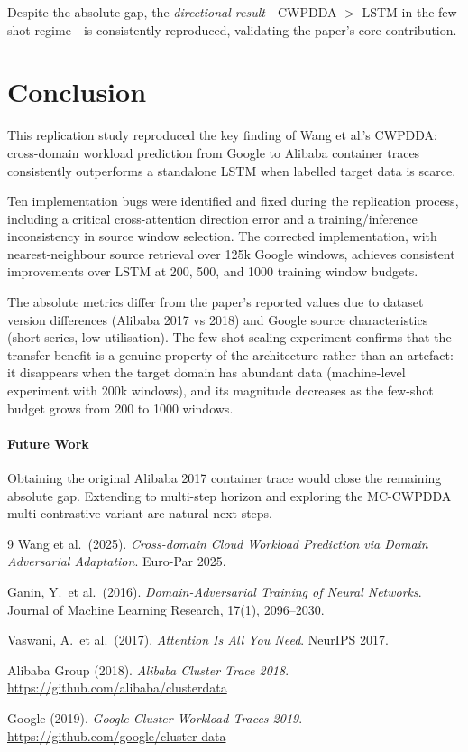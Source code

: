 \documentclass[12pt,a4paper]{article}
\begin{document}
Despite the absolute gap, the \emph{directional result}—CWPDDA $>$ LSTM in the
few-shot regime—is consistently reproduced, validating the paper's core contribution.

\section{Conclusion}

This replication study reproduced the key finding of Wang et al.'s CWPDDA:
cross-domain workload prediction from Google to Alibaba container traces consistently
outperforms a standalone LSTM when labelled target data is scarce.

Ten implementation bugs were identified and fixed during the replication process,
including a critical cross-attention direction error and a training/inference
inconsistency in source window selection.  The corrected implementation, with
nearest-neighbour source retrieval over 125k Google windows, achieves consistent
improvements over LSTM at 200, 500, and 1000 training window budgets.

The absolute metrics differ from the paper's reported values due to dataset version
differences (Alibaba 2017 vs 2018) and Google source characteristics (short series,
low utilisation).  The few-shot scaling experiment confirms that the transfer benefit
is a genuine property of the architecture rather than an artefact: it disappears when
the target domain has abundant data (machine-level experiment with 200k windows), and
its magnitude decreases as the few-shot budget grows from 200 to 1000 windows.

\paragraph{Future Work}
Obtaining the original Alibaba 2017 container trace would close the remaining
absolute gap.  Extending to multi-step horizon and exploring the MC-CWPDDA
multi-contrastive variant are natural next steps.

\begin{thebibliography}{9}
Wang et al.\ (2025).
\textit{Cross-domain Cloud Workload Prediction via Domain Adversarial Adaptation}.
Euro-Par 2025.

Ganin, Y.\ et al.\ (2016).
\textit{Domain-Adversarial Training of Neural Networks}.
Journal of Machine Learning Research, 17(1), 2096–2030.

Vaswani, A.\ et al.\ (2017).
\textit{Attention Is All You Need}.
NeurIPS 2017.

Alibaba Group (2018).
\textit{Alibaba Cluster Trace 2018}.
\url{https://github.com/alibaba/clusterdata}

Google (2019).
\textit{Google Cluster Workload Traces 2019}.
\url{https://github.com/google/cluster-data}
\end{thebibliography}
\end{document}
